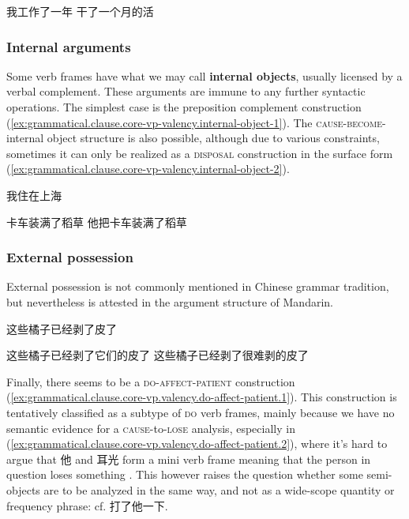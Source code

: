 \documentclass[UTF8, a4paper, oneside, scheme=plain, 12pt]{ctexrep}
\newcommand*{\concept}[1]{\textbf{#1}}
\newcommand*{\category}[1]{\textsc{#1}}
\begin{document}
\begin{exe}
    \ex\label{ex:grammatical.clause.core-vp-valency.semi-object} 我工作了一年
    \ex\label{ex:grammatical.clause.core-vp-valency.pseudo-attributive} 干了一个月的活
\end{exe}

\subsubsection{Internal arguments}\label{sec:grammatical.clause.core-vp.internal}

Some verb frames have what we may call \concept{internal objects}, usually licensed by a verbal complement.
These arguments are immune to any further syntactic operations.
The simplest case is the preposition complement construction (\ref{ex:grammatical.clause.core-vp-valency.internal-object-1}).
The \category{cause}-\category{become}-internal object structure is also possible,
although due to various constraints, sometimes it can only be realized as a \category{disposal} construction in the surface form (\ref{ex:grammatical.clause.core-vp-valency.internal-object-2}).


\begin{exe}
    \ex\label{ex:grammatical.clause.core-vp-valency.internal-object-1}
    我住在上海
    \ex\label{ex:grammatical.clause.core-vp-valency.internal-object-2} 
    \begin{xlist}
        \ex 卡车装满了稻草
        \ex 他把卡车装满了稻草
    \end{xlist}
\end{exe}

\subsubsection{External possession}

External possession is not commonly mentioned in Chinese grammar tradition,
but nevertheless is attested in the argument structure of Mandarin.

\begin{exe}
    \ex 这些橘子已经剥了皮了
    \ex\begin{xlist}
        \ex *这些橘子已经剥了它们的皮了
        \ex *这些橘子已经剥了很难剥的皮了
    \end{xlist}
\end{exe}

Finally, there seems to be a \category{do}-\category{affect}-\category{patient} construction
(\ref{ex:grammatical.clause.core-vp.valency.do-affect-patient.1}).
This construction is tentatively classified as a subtype of \category{do} verb frames,
mainly because we have no semantic evidence for a \category{cause}-to-\category{lose} analysis,
especially in (\ref{ex:grammatical.clause.core-vp.valency.do-affect-patient.2}),
where it's hard to argue that 他 and 耳光 form a mini verb frame meaning that the person in question loses something
\citep{huang2007}.
This however raises the question whether some semi-objects are to be analyzed in the same way,
and not as a wide-scope quantity or frequency phrase: cf. 打了他一下.
\end{document}

